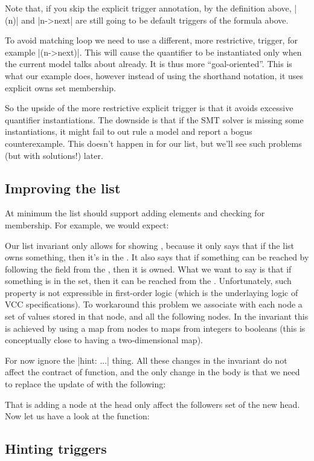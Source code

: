 Note that, if you skip the explicit trigger annotation, by the definition
above, \vcc|{\mine(n)}| and \vcc|n->next| are still going to be default
triggers of the formula above.

To avoid matching loop we need to use a different, more restrictive,
trigger, for example \vcc|{\mine(n->next)}|.
This will cause the quantifier to be instantiated only when the current
model talks about  already.
It is thus more ``goal-oriented''.
This is what our example does, however instead of using the shorthand
notation, it uses explicit owns set membership.

So the upside of the more restrictive explicit trigger is that it avoids
excessive quantifier instantiations.
The downside is that if the SMT solver is missing some instantiations,
it might fail to out rule a model and report a bogus counterexample.
This doesn't happen in for our list, but we'll see such problems
(but with solutions!) later.

\subsection{Improving the list}

At minimum the list should support adding elements and checking
for membership. For example, we would expect:


\noindent
Our list invariant only allows for showing
, because it only says
that if the list owns something, then it's in the .
It also says that if something can be reached by following
the  field from the , then it is owned.
What we want to say is that if something is in the 
set, then it can be reached from the .
Unfortunately, such property is not expressible in first-order
logic (which is the underlaying logic of VCC specifications).
To workaround this problem we associate with each node
a set of values stored in that node, and all the following nodes.
In the invariant this is achieved by using a map from nodes
to maps from integers to booleans (this is conceptually close
to having a two-dimensional map).


\noindent
{}
For now ignore the \vcc|{hint: ...}| thing.
All these changes in the invariant do not affect
the contract of  function, and the only change in the body
is that we need to replace the update of  with the following:


\noindent
That is adding a node at the head only affect the followers set of the new head.
Now let us have a look at the  function:


\subsection{Hinting triggers}

